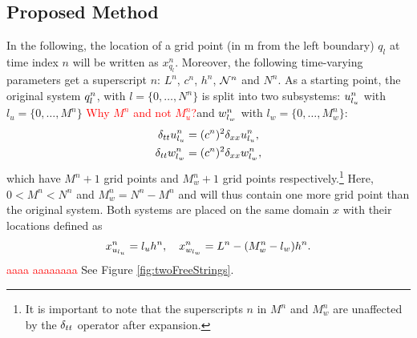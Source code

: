 \documentclass[fleqn]{jaes}
\def\SBcomment[#1]{\textcolor{red}{#1}}
\begin{document}
\subsection{Proposed Method}
In the following, the location of a grid point (in m from the left boundary) $q_l$ at time index $n$ will be written as $x_{q_l}^n$. Moreover, the following time-varying parameters get a superscript $n$: $L^n$, $c^n$, $h^n$, $\mathcal{N}^n$ and $N^n$. %
As a starting point, the original system $q_l^n$, with $l=\{0, \hdots, N^n\}$ is split into two subsystems: $u_{l_u}^n$ with $l_u=\{0, \hdots, M^n\}$ \SBcomment[Why $M^{n}$ and not $M_{u}^{n}$?]and $w_{l_w}^n$ with  $l_w=\{0, \hdots, M_w^n\}$:
\begin{subequations}\label{eq:splitFDS}
    \begin{align}
        \delta_{tt} u_{l_u}^n &= (c^n)^2\delta_{xx} u_{l_u}^n,\\
        \delta_{tt} w_{l_w}^n &= (c^n)^2\delta_{xx} w_{l_w}^n,
    \end{align}
\end{subequations}
which have $M^n+1$ grid points and $M_w^n+1$ grid points respectively.\footnote{It is important to note that the superscripts $n$ in $M^n$ and $M_w^n$ are unaffected by the $\delta_{tt}$ operator after expansion.} Here, $0<M^n<N^n$ and $M_w^n = N^n - M^n$ and will thus contain one more grid point than the original system. Both systems are placed on the same domain $x$ with their locations defined as
\begin{equation}\label{eq:gridLocations}
    x_{u_\lu}^n =\lu h^n, \quad x_{w_\lw}^n = L^n-(M_w^n-\lw)h^n.
\end{equation}
\SBcomment[aaaa aaaaaaaa] %
 See Figure \ref{fig:twoFreeStrings}.
\def\figwidth{0.99}
\end{document}
